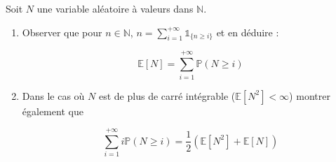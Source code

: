 \medskip

\begin{mdframed}
\begin{exercice}
Soit $N$ une variable aléatoire à valeurs dans $\mathbb{N}$.

\begin{enumerate}
    \item Observer que pour $n \in \mathbb{N}$, $n = \sum_{i=1}^{+\infty} \mathbb{1}_{\{n \geq i\}}$ et en déduire :
    
    $$
    \mathbb{E}[N] = \sum_{i=1}^{+\infty} \mathbb{P}(N \geq i)
    $$
    \item Dans le cas où $N$ est de plus de carré intégrable ($\mathbb{E}[N^2] < \infty$) montrer également que
    
    $$
    \sum_{i=1}^{+\infty} i\mathbb{P}(N \geq i) = \frac{1}{2} (\mathbb{E}[N^2] + \mathbb{E}[N])
    $$
\end{enumerate}
\end{exercice}
\end{mdframed}
